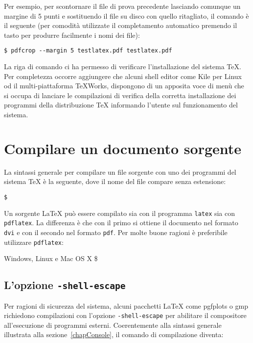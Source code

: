 Per esempio, per scontornare il file di prova precedente lasciando comunque un margine di 5 punti e sostituendo il file su disco con quello ritagliato, il comando è il seguente (per comodità utilizzate il completamento automatico premendo il tasto  per produrre facilmente i nomi dei file):
\begin{verbatim}
$ pdfcrop --margin 5 testlatex.pdf testlatex.pdf
\end{verbatim}


La riga di comando ci ha permesso di verificare l'installazione del sistema \TeX. Per completezza occorre aggiungere che alcuni shell editor come Kile per Linux od il multi-piattaforma TeXWorks, dispongono di un apposita voce di menù che si occupa di lanciare le compilazioni di verifica della corretta installazione dei programmi della distribuzione \TeX{} informando l'utente sul funzionamento del sistema.

\section{Compilare un documento sorgente}

La sintassi generale per compilare un file sorgente con uno dei programmi del sistema \TeX{} è la seguente, dove il nome del file compare senza estensione:

\medskip
\texttt{\$   }
\medskip

Un sorgente \LaTeX{} può essere compilato sia con il programma \texttt{latex} sia con \texttt{pdflatex}. La differenza è che con il primo si ottiene il documento nel formato \texttt{dvi} e con il secondo nel formato \texttt{pdf}. Per molte buone ragioni è preferibile utilizzare \texttt{pdflatex}:
\begin{tcolorbox}
Windows, Linux e Mac OS X
\tcblower
\ttfamily
\$  
\end{tcolorbox}

\subsection{L'opzione \texttt{-shell-escape}}

Per ragioni di sicurezza del sistema, alcuni pacchetti \LaTeX{} come \textsf{pgfplots} o \textsf{gmp} richiedono compilazioni con l'opzione \texttt{-shell-escape} per abilitare il compositore all'esecuzione di programmi esterni. Coerentemente alla sintassi generale illustrata alla sezione~\ref{chapConsole}, il comando di compilazione diventa:

